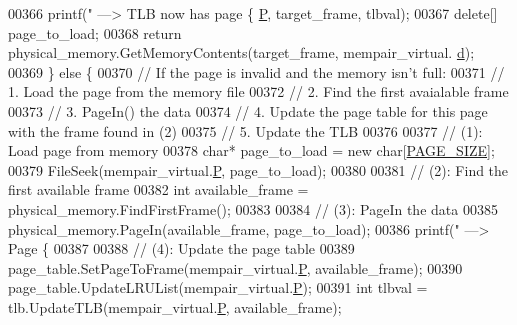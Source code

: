 \begin{DoxyCode}
{{{{{{{{{{{{{{{{{{{{{{{{{{{{{{{00366             printf(\textcolor{stringliteral}{" ---> TLB now has page \{%
      \hyperlink{structMemoryPairAddress__t_a5bc11426b27565b959f280dd1a18b080}{P}, target\_frame, tlbval);
00367             \textcolor{keyword}{delete}[] page\_to\_load;
00368             \textcolor{keywordflow}{return} physical\_memory.GetMemoryContents(target\_frame, mempair\_virtual.
      \hyperlink{structMemoryPairAddress__t_ad608e86288286889c2658e8043414edf}{d});
00369         \} \textcolor{keywordflow}{else} \{
00370             \textcolor{comment}{// If the page is invalid and the memory isn't full:}
00371             \textcolor{comment}{//      1. Load the page from the memory file}
00372             \textcolor{comment}{//      2. Find the first avaialable frame}
00373             \textcolor{comment}{//      3. PageIn() the data}
00374             \textcolor{comment}{//      4. Update the page table for this page with the frame found in (2)}
00375             \textcolor{comment}{//      5. Update the TLB}
00376             
00377             \textcolor{comment}{// (1): Load page from memory}
00378             \textcolor{keywordtype}{char}* page\_to\_load = \textcolor{keyword}{new} \textcolor{keywordtype}{char}[\hyperlink{memory_8h_a7d467c1d283fdfa1f2081ba1e0d01b6e}{PAGE\_SIZE}];
00379             FileSeek(mempair\_virtual.\hyperlink{structMemoryPairAddress__t_a5bc11426b27565b959f280dd1a18b080}{P}, page\_to\_load);
00380 
00381             \textcolor{comment}{// (2): Find the first available frame}
00382             \textcolor{keywordtype}{int} available\_frame = physical\_memory.FindFirstFrame();
00383 
00384             \textcolor{comment}{// (3): PageIn the data}
00385             physical\_memory.PageIn(available\_frame, page\_to\_load);
00386             printf(\textcolor{stringliteral}{" ---> Page \{%
00387 
00388             \textcolor{comment}{// (4): Update the page table}
00389             page\_table.SetPageToFrame(mempair\_virtual.\hyperlink{structMemoryPairAddress__t_a5bc11426b27565b959f280dd1a18b080}{P}, available\_frame);
00390             page\_table.UpdateLRUList(mempair\_virtual.\hyperlink{structMemoryPairAddress__t_a5bc11426b27565b959f280dd1a18b080}{P});
00391             \textcolor{keywordtype}{int} tlbval = tlb.UpdateTLB(mempair\_virtual.\hyperlink{structMemoryPairAddress__t_a5bc11426b27565b959f280dd1a18b080}{P}, available\_frame);
}}}}}}}}}}}}}}}}}}}}}}}}}}}}}}}}}
\end{DoxyCode}
